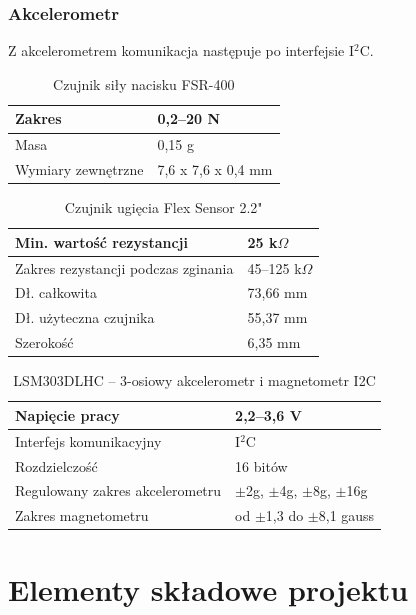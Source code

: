 \documentclass[12pt,a4paper]{article}
\begin{document}
\subsubsection{Akcelerometr}
Z akcelerometrem komunikacja następuje po interfejsie I$^2$C.


\begin{table}[!htb]
\centering
\begin{tabularx}
{\textwidth}{ |X|X| }
\hline
Zakres & 0,2--20 N \\
\hline
Masa & 0,15 g \\ 
\hline
Wymiary zewnętrzne & 7,6 x 7,6 x 0,4 mm \\
\hline
\end{tabularx}
\caption{Czujnik siły nacisku FSR-400}
\label{table:tabela_fsr-400}
\end{table}


\begin{table}[!htb]
\centering
\begin{tabularx}
{\textwidth}{ |X|X| }
\hline
Min. wartość rezystancji & 25 k$\Omega$ \\
\hline
Zakres rezystancji podczas zginania & 45--125 k$\Omega$ \\
\hline
Dł. całkowita & 73,66 mm \\
\hline
Dł. użyteczna czujnika & 55,37 mm \\ 
\hline
Szerokość & 6,35 mm \\
\hline
\end{tabularx}
\caption{Czujnik ugięcia Flex Sensor 2.2"}
\label{table:tabela_flexsensor}
\end{table}


\begin{table}[!htb]
\centering
\begin{tabularx}
{\textwidth}{ |X|X| }
\hline
Napięcie pracy & 2,2--3,6 V \\
\hline
Interfejs komunikacyjny & I$^2$C \\
\hline
Rozdzielczość & 16 bitów \\
\hline
Regulowany zakres akcelerometru &  $\pm$2g, $\pm$4g, $\pm$8g, $\pm$16g \\ 
\hline
Zakres magnetometru &  od $\pm$1,3 do $\pm$8,1 gauss \\ 
\hline
\end{tabularx}
\caption{LSM303DLHC -- 3-osiowy akcelerometr i magnetometr I2C}
\label{table:tabela_akcelerometr}
\end{table}

\section{Elementy składowe projektu}
\end{document}
